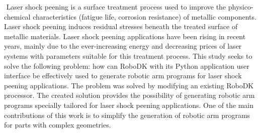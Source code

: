 ﻿%
﻿
Laser shock peening is a surface treatment process used to improve the physico-chemical characteristics (fatigue life, corrosion resistance) of metallic components. Laser shock peening induces residual stresses beneath the treated surface of metallic materials. Laser shock peening applications have been rising in recent years, mainly due to the ever-increasing energy and decreasing prices of laser systems with parameters suitable for this treatment process. This study seeks to solve the following problem: how can RoboDK with its Python application user interface be effectively used to generate robotic arm programs for laser shock peening applications. The problem was solved by modifying an existing RoboDK processor. The created solution provides the possibility of generating robotic arm programs specially tailored for laser shock peening applications. One of the main contributions of this work is to simplify the generation of robotic arm programs for parts with complex geometries.


